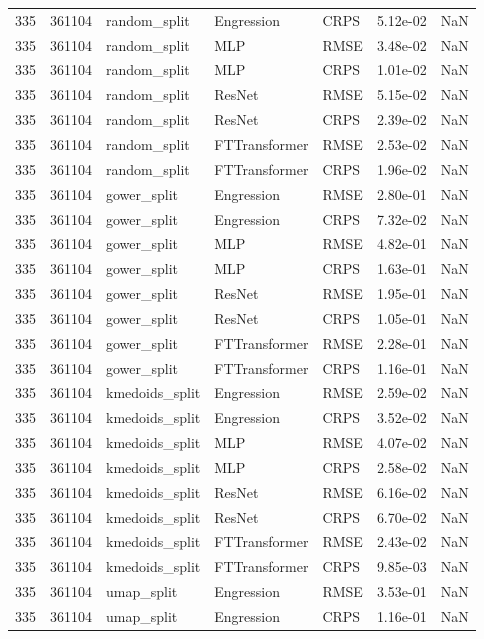 \begin{tabular}{rrlllrr}
335 & 361104 & random\_split & Engression & CRPS & 5.12e-02 & NaN \\
335 & 361104 & random\_split & MLP & RMSE & 3.48e-02 & NaN \\
335 & 361104 & random\_split & MLP & CRPS & 1.01e-02 & NaN \\
335 & 361104 & random\_split & ResNet & RMSE & 5.15e-02 & NaN \\
335 & 361104 & random\_split & ResNet & CRPS & 2.39e-02 & NaN \\
335 & 361104 & random\_split & FTTransformer & RMSE & 2.53e-02 & NaN \\
335 & 361104 & random\_split & FTTransformer & CRPS & 1.96e-02 & NaN \\
335 & 361104 & gower\_split & Engression & RMSE & 2.80e-01 & NaN \\
335 & 361104 & gower\_split & Engression & CRPS & 7.32e-02 & NaN \\
335 & 361104 & gower\_split & MLP & RMSE & 4.82e-01 & NaN \\
335 & 361104 & gower\_split & MLP & CRPS & 1.63e-01 & NaN \\
335 & 361104 & gower\_split & ResNet & RMSE & 1.95e-01 & NaN \\
335 & 361104 & gower\_split & ResNet & CRPS & 1.05e-01 & NaN \\
335 & 361104 & gower\_split & FTTransformer & RMSE & 2.28e-01 & NaN \\
335 & 361104 & gower\_split & FTTransformer & CRPS & 1.16e-01 & NaN \\
335 & 361104 & kmedoids\_split & Engression & RMSE & 2.59e-02 & NaN \\
335 & 361104 & kmedoids\_split & Engression & CRPS & 3.52e-02 & NaN \\
335 & 361104 & kmedoids\_split & MLP & RMSE & 4.07e-02 & NaN \\
335 & 361104 & kmedoids\_split & MLP & CRPS & 2.58e-02 & NaN \\
335 & 361104 & kmedoids\_split & ResNet & RMSE & 6.16e-02 & NaN \\
335 & 361104 & kmedoids\_split & ResNet & CRPS & 6.70e-02 & NaN \\
335 & 361104 & kmedoids\_split & FTTransformer & RMSE & 2.43e-02 & NaN \\
335 & 361104 & kmedoids\_split & FTTransformer & CRPS & 9.85e-03 & NaN \\
335 & 361104 & umap\_split & Engression & RMSE & 3.53e-01 & NaN \\
335 & 361104 & umap\_split & Engression & CRPS & 1.16e-01 & NaN \\

\end{tabular}
